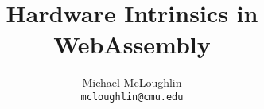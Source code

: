 \documentclass{article}
\begin{document}
\title{Hardware Intrinsics in WebAssembly}
\author{Michael McLoughlin \\ \texttt{mcloughlin@cmu.edu}}
\maketitle
\end{document}
